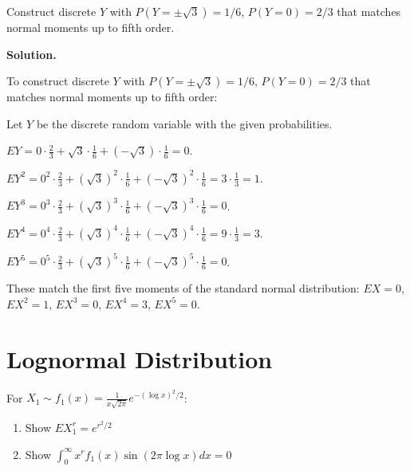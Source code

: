 \begin{problembox}
Construct discrete $Y$ with $P(Y=\pm\sqrt{3})=1/6$, $P(Y=0)=2/3$ that matches normal moments up to fifth order.
\end{problembox}

\noindent\textbf{Solution.}

To construct discrete $Y$ with $P(Y=\pm\sqrt{3})=1/6$, $P(Y=0)=2/3$ that matches normal moments up to fifth order:

Let $Y$ be the discrete random variable with the given probabilities.

$EY = 0 \cdot \frac{2}{3} + \sqrt{3} \cdot \frac{1}{6} + (-\sqrt{3}) \cdot \frac{1}{6} = 0$.

$EY^2 = 0^2 \cdot \frac{2}{3} + (\sqrt{3})^2 \cdot \frac{1}{6} + (-\sqrt{3})^2 \cdot \frac{1}{6} = 3 \cdot \frac{1}{3} = 1$.

$EY^3 = 0^3 \cdot \frac{2}{3} + (\sqrt{3})^3 \cdot \frac{1}{6} + (-\sqrt{3})^3 \cdot \frac{1}{6} = 0$.

$EY^4 = 0^4 \cdot \frac{2}{3} + (\sqrt{3})^4 \cdot \frac{1}{6} + (-\sqrt{3})^4 \cdot \frac{1}{6} = 9 \cdot \frac{1}{3} = 3$.

$EY^5 = 0^5 \cdot \frac{2}{3} + (\sqrt{3})^5 \cdot \frac{1}{6} + (-\sqrt{3})^5 \cdot \frac{1}{6} = 0$.

These match the first five moments of the standard normal distribution: $EX = 0$, $EX^2 = 1$, $EX^3 = 0$, $EX^4 = 3$, $EX^5 = 0$.

\section{Lognormal Distribution}

\begin{problembox}
For $X_1 \sim f_1(x) = \frac{1}{x\sqrt{2\pi}}e^{-(\log x)^2/2}$:
\begin{enumerate}[label=(\alph*)]
    \item Show $EX_1^r = e^{r^2/2}$
    \item Show $\int_0^\infty x^r f_1(x)\sin(2\pi\log x)dx = 0$
\end{enumerate}
\end{problembox}

